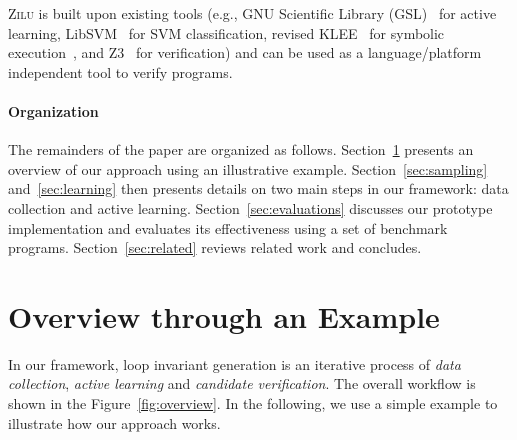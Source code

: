     \textsc{Zilu} is built upon existing tools (e.g., GNU Scientific Library (GSL)~\cite{gough2009gnu} for active learning,
    LibSVM~\cite{chang2011libsvm} for SVM classification,
    revised KLEE~\cite{cadar2008klee} for symbolic execution~\cite{king1976symbolic,symbolic}, and Z3~\cite{de2008z3} for verification) and can be used as a language/platform independent tool to verify programs.

\paragraph{Organization} The remainders of the paper are organized as follows. Section~\ref{sec:overview} presents an overview of our approach using an illustrative example. Section~\ref{sec:sampling} and~\ref{sec:learning} then presents details on two main steps in our framework: data collection and active learning. Section~\ref{sec:evaluations} discusses our prototype implementation and evaluates its effectiveness using a set of benchmark programs. Section~\ref{sec:related} reviews related work and concludes.

\section{Overview through an Example} \label{sec:overview}
In our framework, loop invariant generation is an iterative process of \emph{data collection}, \emph{active learning} and \emph{candidate verification}. The overall workflow is shown in the Figure~\ref{fig:overview}. In the following, we use a simple example to illustrate how our approach works.

